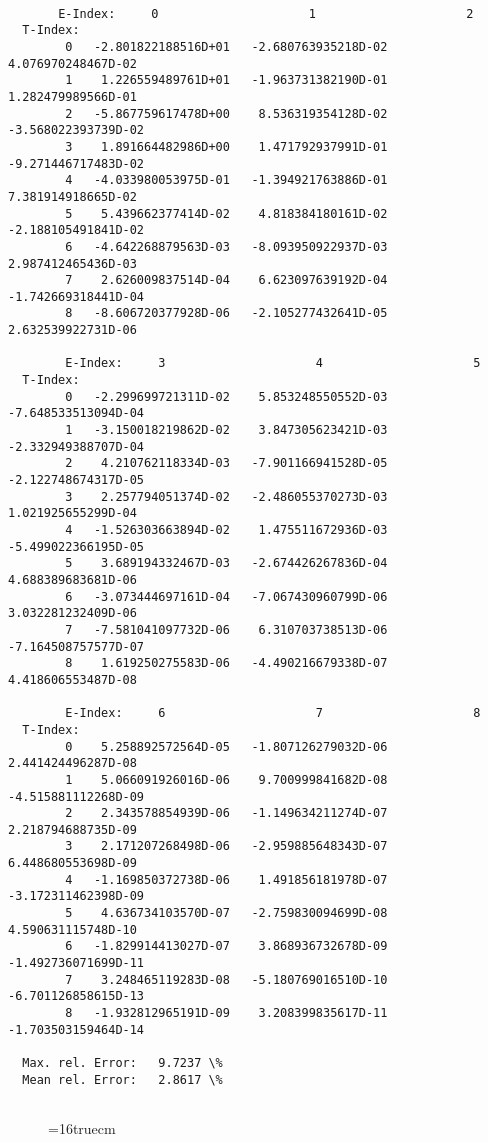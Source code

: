 \documentclass[12pt,dvipdfmx]{article}
\begin{document}
\begin{small}\begin{verbatim}

       E-Index:     0                     1                     2
  T-Index:
        0   -2.801822188516D+01   -2.680763935218D-02    4.076970248467D-02
        1    1.226559489761D+01   -1.963731382190D-01    1.282479989566D-01
        2   -5.867759617478D+00    8.536319354128D-02   -3.568022393739D-02
        3    1.891664482986D+00    1.471792937991D-01   -9.271446717483D-02
        4   -4.033980053975D-01   -1.394921763886D-01    7.381914918665D-02
        5    5.439662377414D-02    4.818384180161D-02   -2.188105491841D-02
        6   -4.642268879563D-03   -8.093950922937D-03    2.987412465436D-03
        7    2.626009837514D-04    6.623097639192D-04   -1.742669318441D-04
        8   -8.606720377928D-06   -2.105277432641D-05    2.632539922731D-06

        E-Index:     3                     4                     5
  T-Index:
        0   -2.299699721311D-02    5.853248550552D-03   -7.648533513094D-04
        1   -3.150018219862D-02    3.847305623421D-03   -2.332949388707D-04
        2    4.210762118334D-03   -7.901166941528D-05   -2.122748674317D-05
        3    2.257794051374D-02   -2.486055370273D-03    1.021925655299D-04
        4   -1.526303663894D-02    1.475511672936D-03   -5.499022366195D-05
        5    3.689194332467D-03   -2.674426267836D-04    4.688389683681D-06
        6   -3.073444697161D-04   -7.067430960799D-06    3.032281232409D-06
        7   -7.581041097732D-06    6.310703738513D-06   -7.164508757577D-07
        8    1.619250275583D-06   -4.490216679338D-07    4.418606553487D-08

        E-Index:     6                     7                     8
  T-Index:
        0    5.258892572564D-05   -1.807126279032D-06    2.441424496287D-08
        1    5.066091926016D-06    9.700999841682D-08   -4.515881112268D-09
        2    2.343578854939D-06   -1.149634211274D-07    2.218794688735D-09
        3    2.171207268498D-06   -2.959885648343D-07    6.448680553698D-09
        4   -1.169850372738D-06    1.491856181978D-07   -3.172311462398D-09
        5    4.636734103570D-07   -2.759830094699D-08    4.590631115748D-10
        6   -1.829914413027D-07    3.868936732678D-09   -1.492736071699D-11
        7    3.248465119283D-08   -5.180769016510D-10   -6.701126858615D-13
        8   -1.932812965191D-09    3.208399835617D-11   -1.703503159464D-14

  Max. rel. Error:   9.7237 \%
  Mean rel. Error:   2.8617 \%


\end{verbatim}\end{small}
\begin{figure} \label{2.2.h2r}
\epsfxsize=16truecm
\end{figure}
\newpage
\end{document}
